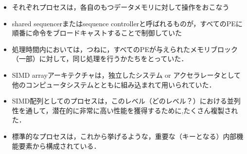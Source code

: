 \documentclass[12pt, unicode, dvipdfmx]{beamer}
\begin{document}
\begin{frame}[t]
	\begin{itemize}
		\item それぞれプロセスは，各自のもつデータメモリに対して操作をおこなう
		\item shared sequencerまたはsequence controllerと呼ばれるものが，すべてのPEに順番に命令をブロードキャストすることで制御していた
		\item 処理時間内においては，つねに，すべてのPEが与えられたメモリブロック（一部）に対して，同じ処理を行うかたちをとっていた．
		\item SIMD arrayアーキテクチャは，独立したシステム or	アクセラレータとして他のコンピュータシステムとともに組み込まれて用いられていた．
	\end{itemize}
\end{frame}

\begin{frame}[t]
	\begin{itemize}
		\item SIMD配列としてのプロセスは，このレベル（どのレベル？）における並列性を通して，潜在的に非常に高い性能を獲得するために,たくさん複製された．
		\item 標準的なプロセスは，これから挙げるような，重要な（キーとなる）内部機能要素から構成されている．
	\end{itemize}
\end{frame}
\end{document}
